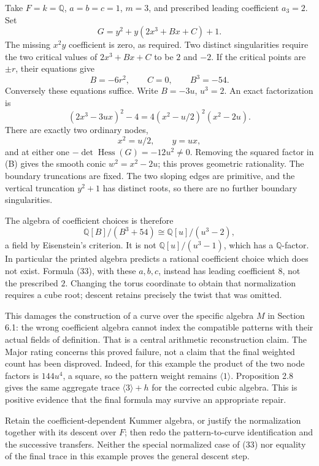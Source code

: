 \documentclass[10pt]{article}
\begin{document}
Take \(F=k=\mathbb Q\), \(a=b=c=1\), \(m=3\), and prescribed leading coefficient \(a_3=2\). Set \[G=y^2+y(2x^3+Bx+C)+1.\] The missing \(x^2y\) coefficient is zero, as required. Two distinct singularities require the two critical values of \(2x^3+Bx+C\) to be \(2\) and \(-2\). If the critical points are \(\pm r\), their equations give \[B=-6r^2,\qquad C=0,\qquad B^3=-54.\] Conversely these equations suffice. Write \(B=-3u\), \(u^3=2\). An exact factorization is \[(2x^3-3ux)^2-4
       =4(x^2-u/2)^2(x^2-2u).                      \tag{B}\] There are exactly two ordinary nodes, \[x^2=u/2,\qquad y=ux,\] and at either one \(-\det\operatorname{Hess}(G)=-12u^2\ne0\). Removing the squared factor in (B) gives the smooth conic \(w^2=x^2-2u\); this proves geometric rationality. The boundary truncations are fixed. The two sloping edges are primitive, and the vertical truncation \(y^2+1\) has distinct roots, so there are no further boundary singularities.\par
The algebra of coefficient choices is therefore \[\mathbb Q[B]/(B^3+54)
       \cong\mathbb Q[u]/(u^3-2),\] a field by Eisenstein’s criterion. It is not \(\mathbb Q[u]/(u^3-1)\), which has a \(\mathbb Q\)-factor. In particular the printed algebra predicts a rational coefficient choice which does not exist. Formula (33), with these \(a,b,c\), instead has leading coefficient \(8\), not the prescribed \(2\). Changing the torus coordinate to obtain that normalization requires a cube root; descent retains precisely the twist that was omitted.\par
This damages the construction of a curve over the specific algebra \(M\) in Section 6.1: the wrong coefficient algebra cannot index the compatible patterns with their actual fields of definition. That is a central arithmetic reconstruction claim. The Major rating concerns this proved failure, not a claim that the final weighted count has been disproved. Indeed, for this example the product of the two node factors is \(144u^4\), a square, so the pattern weight remains \(\langle1\rangle\). Proposition 2.8 gives the same aggregate trace \(\langle3\rangle+h\) for the corrected cubic algebra. This is positive evidence that the final formula may survive an appropriate repair.\par
Retain the coefficient-dependent Kummer algebra, or justify the normalization together with its descent over \(F\); then redo the pattern-to-curve identification and the successive transfers. Neither the special normalized case of (33) nor equality of the final trace in this example proves the general descent step.\par
\end{document}
